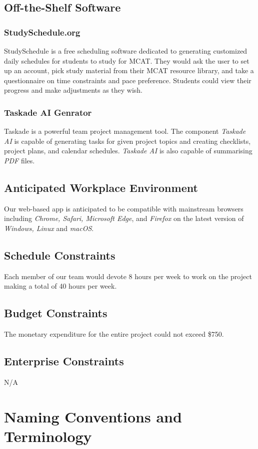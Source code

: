 \documentclass[12pt]{article}
\begin{document}
\subsection{Off-the-Shelf Software}
\subsubsection{StudySchedule.org}
StudySchedule is a free scheduling software dedicated to generating customized daily schedules for students to study for MCAT. They would ask the user to set up an account, pick study material from their MCAT resource library, and take a questionnaire on time constraints and pace preference. Students could view their progress and make adjustments as they wish.
\subsubsection{Taskade AI Genrator}
Taskade is a powerful team project management tool. The component \textit{Taskade AI} is capable of generating tasks for given project topics and creating checklists, project plans, and calendar schedules. \textit{Taskade AI} is also capable of summarising \textit{PDF} files.
\subsection{Anticipated Workplace Environment}
Our web-based app is anticipated to be compatible with mainstream browsers including \textit{Chrome, Safari, Microsoft Edge}, and \textit{Firefox} on the latest version of \textit{Windows, Linux} and \textit{macOS}.
\subsection{Schedule Constraints}
Each member of our team would devote 8 hours per week to work on the project making a total of 40 hours per week.
\subsection{Budget Constraints}
The monetary expenditure for the entire project could not exceed \$750.
\subsection{Enterprise Constraints}
N/A

\section{Naming Conventions and Terminology}
\end{document}
